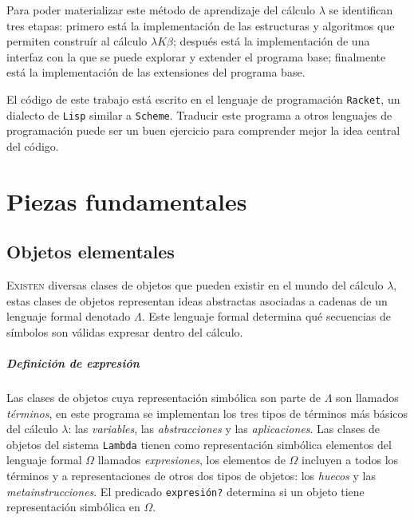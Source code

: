 \documentclass[10pt,oneside,openany,letterpaper]{book}
\newcommand{\titulo}{{\tt{}Lambda}}
\renewcommand{\thechapter}{\Roman{chapter}}
\begin{document}
Para poder materializar este método de aprendizaje del cálculo \( λ \) se identifican tres etapas: primero está la implementación de las estructuras y algoritmos que permiten construír al cálculo \( λKβ \); después está la implementación de una interfaz con la que se puede explorar y extender el programa base; finalmente está la implementación de las extensiones del programa base.

El código de este trabajo está escrito en el lenguaje de programación {\tt{}Racket}, un dialecto de {\tt{}Lisp} similar a {\tt{}Scheme}. Traducir este programa a otros lenguajes de programación puede ser un buen ejercicio para comprender mejor la idea central del código.


\mainmatter

\chapter{Piezas fundamentales}
\markboth{
  \normalsize\hfill\textit{\titulo}\hfill
}{
  \normalsize\hfill\textit{\thechapter.\ \ Piezas fundamentales}\hfill
}
\label{ap2:piezas-fundamentales}

\section{Objetos elementales}

\noindent \lettrine{E}{xisten} diversas clases de objetos que pueden existir en el mundo del cálculo \( λ \), estas clases de objetos representan ideas abstractas asociadas a cadenas de un lenguaje formal denotado \( Λ \). Este lenguaje formal determina qué secuencias de símbolos son válidas expresar dentro del cálculo.

\paragraph{Definición de expresión} Las clases de objetos cuya representación simbólica son parte de \( Λ \) son llamados \emph{términos}, en este programa se implementan los tres tipos de términos más básicos del cálculo \( λ \): las \emph{variables}, las \emph{abstracciones} y las \emph{aplicaciones}. Las clases de objetos del sistema {\tt{}Lambda} tienen como representación simbólica elementos del lenguaje formal \( Ω \) llamados \emph{expresiones}, los elementos de \( Ω \) incluyen a todos los términos y a representaciones de otros dos tipos de objetos: los \emph{huecos} y las \emph{metainstrucciones}. El predicado {\tt{}\protect{}expresión?} determina si un objeto tiene representación simbólica en \( Ω \).
\end{document}

